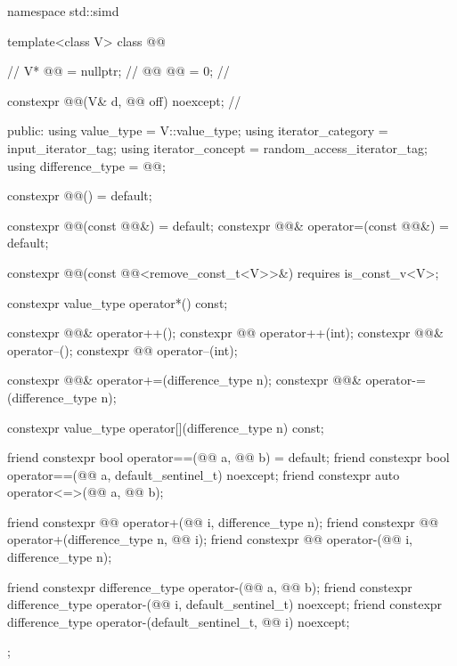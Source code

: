%
%
%
%
\begin{codeblock}
namespace std::simd {
  template<class V>
  class @@ {                                                 // \expos
    V* @@ = nullptr;                                                 // \expos
    @@ @@ = 0;                                         // \expos

    constexpr @@(V& d, @@ off) noexcept;         // \expos

  public:
    using value_type = V::value_type;
    using iterator_category = input_iterator_tag;
    using iterator_concept = random_access_iterator_tag;
    using difference_type = @@;

    constexpr @@() = default;

    constexpr @@(const @@&) = default;
    constexpr @@& operator=(const @@&) = default;

    constexpr @@(const @@<remove_const_t<V>>&) requires is_const_v<V>;

    constexpr value_type operator*() const;

    constexpr @@& operator++();
    constexpr @@ operator++(int);
    constexpr @@& operator--();
    constexpr @@ operator--(int);

    constexpr @@& operator+=(difference_type n);
    constexpr @@& operator-=(difference_type n);

    constexpr value_type operator[](difference_type n) const;

    friend constexpr bool operator==(@@ a, @@ b) = default;
    friend constexpr bool operator==(@@ a, default_sentinel_t) noexcept;
    friend constexpr auto operator<=>(@@ a, @@ b);

    friend constexpr @@ operator+(@@ i, difference_type n);
    friend constexpr @@ operator+(difference_type n, @@ i);
    friend constexpr @@ operator-(@@ i, difference_type n);

    friend constexpr difference_type operator-(@@ a, @@ b);
    friend constexpr difference_type operator-(@@ i, default_sentinel_t) noexcept;
    friend constexpr difference_type operator-(default_sentinel_t, @@ i) noexcept;
  };
}
\end{codeblock}


